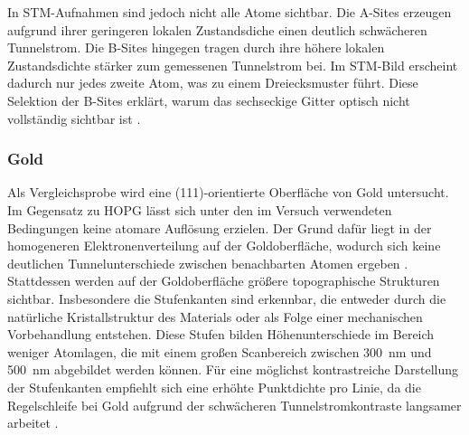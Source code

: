 In STM-Aufnahmen sind jedoch nicht alle Atome sichtbar. Die A-Sites erzeugen aufgrund ihrer geringeren lokalen Zustandsdiche einen deutlich schwächeren Tunnelstrom. 
Die B-Sites hingegen tragen durch ihre höhere lokalen Zustandsdichte stärker zum gemessenen Tunnelstrom bei. 
Im STM-Bild erscheint dadurch nur jedes zweite Atom, was zu einem Dreiecksmuster führt. Diese Selektion der B-Sites erklärt, warum das sechseckige Gitter optisch nicht vollständig sichtbar ist \cite{ScanningTunnelingMicroscopy}.

\subsubsection{Gold}
Als Vergleichsprobe wird eine (111)-orientierte Oberfläche von Gold untersucht. Im Gegensatz zu HOPG lässt sich unter den im Versuch verwendeten Bedingungen keine atomare Auflösung erzielen. 
Der Grund dafür liegt in der homogeneren Elektronenverteilung auf der Goldoberfläche, wodurch sich keine deutlichen Tunnelunterschiede zwischen benachbarten Atomen ergeben \cite{naioManual}.\\

Stattdessen werden auf der Goldoberfläche größere topographische Strukturen sichtbar. Insbesondere die Stufenkanten sind erkennbar, die entweder durch die natürliche Kristallstruktur des Materials oder als Folge einer mechanischen Vorbehandlung entstehen.
Diese Stufen bilden Höhenunterschiede im Bereich weniger Atomlagen, die mit einem großen Scanbereich zwischen \SI{300}{\nano\meter} und \SI{500}{\nano\meter} abgebildet werden können. Für eine möglichst kontrastreiche Darstellung der Stufenkanten empfiehlt sich eine erhöhte Punktdichte pro Linie, da die Regelschleife bei Gold aufgrund der schwächeren Tunnelstromkontraste langsamer arbeitet \cite{anleitungV42}.
